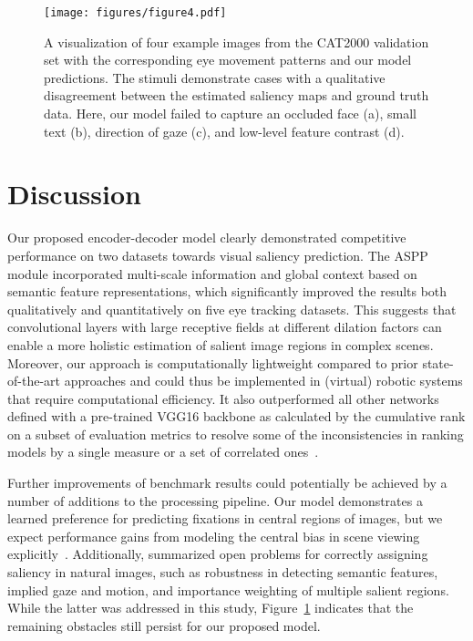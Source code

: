 \documentclass[final,1p,times,number]{elsarticle}
\begin{document}
\begin{figure}[t!]
\centering\texttt{[image: figures/figure4.pdf]}
\caption{A visualization of four example images from the CAT2000 validation set with the corresponding eye movement patterns and our model predictions. The stimuli demonstrate cases with a qualitative disagreement between the estimated saliency maps and ground truth data. Here, our model failed to capture an occluded face (a), small text (b), direction of gaze (c), and low-level feature contrast (d).}
\label{fig:fig4}
\end{figure}

\section{Discussion}

Our proposed encoder-decoder model clearly demonstrated competitive performance on two datasets towards visual saliency prediction. The ASPP module incorporated multi-scale information and global context based on semantic feature representations, which significantly improved the results both qualitatively and quantitatively on five eye tracking datasets. This suggests that convolutional layers with large receptive fields at different dilation factors can enable a more holistic estimation of salient image regions in complex scenes. Moreover, our approach is computationally lightweight compared to prior state-of-the-art approaches and could thus be implemented in (virtual) robotic systems that require computational efficiency. It also outperformed all other networks defined with a pre-trained VGG16 backbone as calculated by the cumulative rank on a subset of evaluation metrics to resolve some of the inconsistencies in ranking models by a single measure or a set of correlated ones~\cite{riche2013saliency,bylinskii2018different}.

Further improvements of benchmark results could potentially be achieved by a number of additions to the processing pipeline. Our model demonstrates a learned preference for predicting fixations in central regions of images, but we expect performance gains from modeling the central bias in scene viewing explicitly~\cite{kummerer2014deep,kummerer2016deepgaze,cornia2016deep,Cornia2018PredictingHE,kruthiventi2017deepfix}. Additionally, \citet{bylinskii2015saliency} summarized open problems for correctly assigning saliency in natural images, such as robustness in detecting semantic features, implied gaze and motion, and importance weighting of multiple salient regions. While the latter was addressed in this study, Figure~\ref{fig:fig4} indicates that the remaining obstacles still persist for our proposed model.
\end{document}
